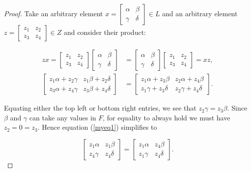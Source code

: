 \documentclass[a4paper , 11pt]{book}
\theoremstyle{definition}
\theoremstyle{remark}
\begin{document}
\begin{proof} Take an arbitrary element $x=\begin{bmatrix} \alpha & \beta \\ \gamma & \delta \end{bmatrix} \in L$ and  an arbitrary element $z = \begin{bmatrix} z_1 & z_2 \\ z_3 & z_4 \end{bmatrix} \in Z$ and consider their product:

\begin{align}\label{myeq1} zx = \begin{bmatrix} z_1 & z_2 \\ z_3 & z_4 \end{bmatrix} \begin{bmatrix} \alpha & \beta \\ \gamma & \delta \end{bmatrix} &= \begin{bmatrix} \alpha & \beta \\ \gamma & \delta \end{bmatrix} \begin{bmatrix} z_1 & z_2 \\ z_3 & z_4 \end{bmatrix} = xz, \nonumber \\[1.5ex]
\begin{bmatrix} z_1 \alpha + z_2 \gamma & z_1 \beta + z_2 \delta \\ z_3 \alpha + z_4 \gamma & z_3 \beta + z_4 \delta \end{bmatrix} &= \begin{bmatrix} z_1 \alpha + z_3 \beta & z_2 \alpha + z_4 \beta \\ z_1 \gamma + z_3 \delta & z_2 \gamma + z_4 \delta \end{bmatrix}.
\end{align}

\noindent Equating either the top left or bottom right entries, we see that $z_2 \gamma = z_3 \beta$. Since $\beta$ and $\gamma$ can take any values in $F$, for equality to always hold we must have $z_2 = 0 = z_3$. Hence equation (\ref{myeq1}) simplifies to

\begin{equation*} \begin{bmatrix} z_1 \alpha & z_1 \beta \\ z_4 \gamma & z_4 \delta \end{bmatrix} = \begin{bmatrix} z_1 \alpha & z_4 \beta \\ z_1 \gamma & z_4 \delta \end{bmatrix}. \end{equation*}


\end{proof}
\end{document}
